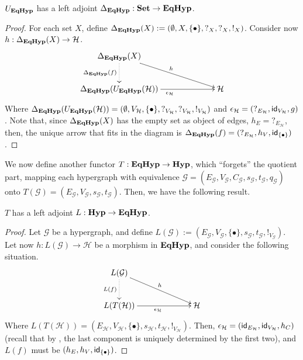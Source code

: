 \begin{proposition}
	$U_{\textbf{\textup{EqHyp}}}$ has a left adjoint $\Delta_{\textbf{\textup{EqHyp}}}: \mathbf{Set} \to \textbf{\textup{EqHyp}}$.
\end{proposition}

\begin{proof}
	For each set $X$, define $\Delta_{\textbf{\textup{EqHyp}}}(X):= (\emptyset, X, \{\bullet\}, ?_X, ?_X, !_X)$. Consider now $h: \Delta_{\textbf{\textup{EqHyp}}}(X) \to \mathcal{H}$.
	\[\xymatrix@C=2.3cm{
			\Delta_{\EqHyp}(X) \ar@{.>}[d]_{\Delta_\EqHyp(f)} \ar[dr]^{h} & \\
			\Delta_\EqHyp(U_{\EqHyp}(\mathcal{H})) \ar[r]_{\epsilon_{\mathcal{H}}} & \mathcal{H}
	}\]
	Where $\Delta_{\textbf{\textup{EqHyp}}}(U_{\textbf{\textup{EqHyp}}}(\mathcal{H})) = (\emptyset, V_\mathcal{H}, \{\bullet\}, ?_{V_\mathcal{H}}, ?_{V_\mathcal{H}}, !_{V_\mathcal{H}})$ and $\epsilon_{\mathcal{H}} = (?_{E_\mathcal{H}}, \mathsf{id}_{V_\mathcal{H}}, g)$.
	Note that, since $\Delta_{\textbf{\textup{EqHyp}}}(X)$ has the empty set as object of edges, $h_E = ?_{E_\mathcal{H}}$, then, the unique arrow that fits in the diagram is $\Delta_{\textbf{\textup{EqHyp}}}(f) = (?_{E_\mathcal{H}}, h_V, \mathsf{id}_{\{\bullet\}})$.

\end{proof}

We now define another functor $T: \textbf{\textup{EqHyp}} \to \textbf{\textup{Hyp}}$, which ``forgets'' the quotient part, mapping each hypergraph with equivalence $\mathcal{G} = (E_\mathcal{G}, V_{\mathcal{G}}, C_\mathcal{G}, s_\mathcal{G}, t_\mathcal{G}, q_\mathcal{G})$ onto $T(\mathcal{G})=(E_{\mathcal{G}}, V_{\mathcal{G}}, s_\mathcal{G}, t_{\mathcal{G}})$. Then, we have the following result.

\begin{proposition}
	$T$ has a left adjoint $L: \textbf{\textup{Hyp}} \to \textbf{\textup{EqHyp}}$.
\end{proposition}

\begin{proof}
	Let $\mathcal{G}$ be a hypergraph, and define $L(\mathcal{G}) := (E_\mathcal{G}, V_{\mathcal{G}}, \{\bullet\}, s_\mathcal{G}, t_\mathcal{G}, !_{V_\mathcal{G}})$. Let now $h: L(\mathcal{G})\to \mathcal{H}$ be a morphism in $\textbf{\textup{EqHyp}}$, and consider the following situation.
	\[\xymatrix@C=2.3cm{
		L(\mathcal{G}) \ar@{.>}[d]_{L(f)} \ar[dr]^{h}\\ L(T(\mathcal{H})) \ar[r]_{\epsilon_{\mathcal{H}}} & \mathcal{H}
	}\]
	Where $L(T(\mathcal{H}))=(E_\mathcal{H}, V_{\mathcal{H}}, \{\bullet\}, s_\mathcal{H}, t_\mathcal{H}, !_{V_\mathcal{H}})$. Then, $\epsilon_\mathcal{H} = (\mathsf{id}_{E_\mathcal{H}}, \mathsf{id}_{V_\mathcal{H}}, h_C)$ (recall that by , the last component is uniquely determined by the first two), and $L(f)$ must be $(h_E, h_V, \mathsf{id}_{\{\bullet\}})$.
\end{proof}

